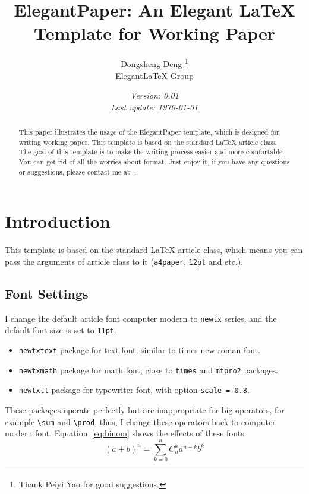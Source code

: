 \documentclass{elegantpaper}
\title{ElegantPaper: An Elegant \LaTeX{} Template for Working Paper}
\author{\href{https://ddswhu.me/}{Dongsheng Deng} %
		\thanks{Thank Peiyi Yao for good suggestions.} \\[0.5ex] %
		Elegant\LaTeX{} Group}
\date{\small\itshape Version: 0.01 \\ Last update: \today}
\begin{document}
\maketitle

\begin{abstract}
	This paper illustrates the usage of the ElegantPaper template, which is designed for writing working paper. This template is based on the standard \LaTeX{} article class. The goal of this template is to make the writing process easier and more comfortable. You can get rid of all the worries about format. Just enjoy it, if you have any questions or suggestions, please contact me at: .
\end{abstract}

\section{Introduction}

This template is based on the standard \LaTeX{} article class, which means you can pass the arguments of article class to it (\verb|a4paper|, \verb|12pt| and etc.).

\subsection{Font Settings}
I change the default article font computer modern to \verb|newtx| series, and the default font size is set to \verb|11pt|.

\begin{itemize}[noitemsep]
	\item \verb|newtxtext| package for text font, similar to times new roman font.
	\item \verb|newtxmath| package for math font, close to \verb|times| and \verb|mtpro2| packages.
	\item \verb|newtxtt| package for typewriter font, with option \verb|scale = 0.8|.
\end{itemize}

These packages operate perfectly but are inappropriate for big operators, for example \verb|\sum| and \verb|\prod|, thus, I change these operators back to computer modern font. Equation~\eqref{eq:binom} shows the effects of these fonts:
\begin{equation}
(a+b)^{n} = \sum_{k=0}^{n} C_{n}^{k} a^{n-k} b^k \label{eq:binom}
\end{equation}
\end{document}

